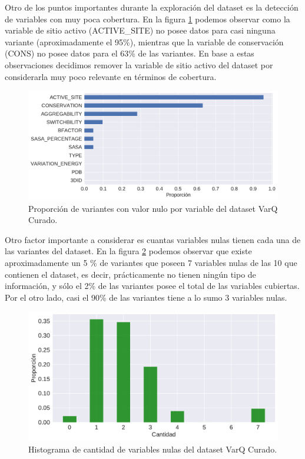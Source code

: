 Otro de los puntos importantes durante la exploración del dataset es la detección de variables con muy poca cobertura. En la figura \ref{fig:proporcion_nulos_varq} podemos observar como la variable de sitio activo (ACTIVE\_SITE) no posee datos para casi ninguna variante (aproximadamente el 95\%), mientras que la variable de conservación (CONS) no posee datos para el 63\% de las variantes. En base a estas observaciones decidimos remover la variable de sitio activo del dataset por considerarla muy poco relevante en términos de cobertura.

\begin{figure}[H]
    \centering
    \includegraphics[scale=0.55]{documents/latex/figures/3/varq/proporcion_nulos.pdf}
    \caption{Proporción de variantes con valor nulo por variable del dataset VarQ Curado.}
    \label{fig:proporcion_nulos_varq}
\end{figure}

Otro factor importante a considerar es cuantas variables nulas tienen cada una de las variantes del dataset. En la figura \ref{fig:nulos_varq} podemos observar que existe aproximadamente un 5 \% de variantes que poseen 7 variables nulas de las 10 que contienen el dataset, es decir, prácticamente no tienen ningún tipo de información, y sólo el 2\% de las variantes posee el total de las variables cubiertas. Por el otro lado, casi el 90\% de las variantes tiene a lo sumo 3 variables nulas.

\begin{figure}[H]
    \centering
    \includegraphics[scale=0.55]{documents/latex/figures/3/varq/nulos_varq.pdf}
    \caption{Histograma de cantidad de variables nulas del dataset VarQ Curado.}
    \label{fig:nulos_varq}
\end{figure}

